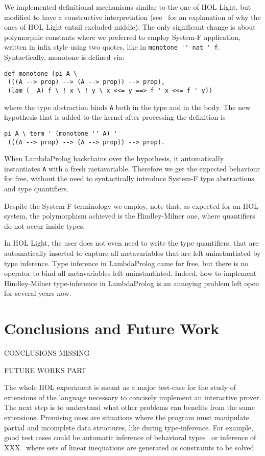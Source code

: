 \documentclass[preprint]{sigplanconf}
\begin{document}
We implemented definitional mechanisms similar to the one of HOL Light, but modified to have a constructive interpretation (see~\cite{arthan} for an explanation of why the ones of HOL Light entail excluded middle). The only significant change is about polymorphic constants where we preferred to employ System-F application, written in infix style using two quotes, like in \verb+monotone '' nat ' f+. Syntactically, monotone is defined via:

{\small
\begin{verbatim}
def monotone (pi A \
 (((A --> prop) --> (A --> prop)) --> prop),
 (lam (_ A) f \ ! x \ ! y \ x <<= y ==> f ' x <<= f ' y))
\end{verbatim}
}

where the type abstraction binds \verb+A+ both in the type and in the body.
The new hypothesis that is added to the kernel after processing the definition
is
{\small \begin{verbatim}
pi A \ term ' (monotone '' A) '
 (((A --> prop) --> (A --> prop)) --> prop).
\end{verbatim}}
When LambdaProlog backchains over the hypothesis, it automatically instantiates \verb+A+ with a fresh metavariable. Therefore we get the expected behaviour for free, without the need to syntactically introduce System-F type abstractions and type quantifiers.

Despite the System-F terminology we employ, note that, as expected for an HOL system, the polymorphism achieved is the Hindley-Milner one, where quantifiers do not occur inside types.

In HOL Light, the user does not even need to write the type quantifiers, that
are automatically inserted to capture all metavariables that are left uninstantiated by type inference. Type inference in LambdaProlog came for free, but there is no operator to bind all metavariables left uninstantiated. Indeed, how to implement Hindley-Milner type-inference in LambdaProlog is an annoying problem left open for several years now.

\section{Conclusions and Future Work}

CONCLUSIONS MISSING

FUTURE WORKS PART

The whole HOL experiment is meant as a major test-case for the study of extensions of the language necessary to concisely implement an interactive prover. The next step is to understand what other problems can benefits from the same extensions. Promising ones are situations where the program must manipulate partial and incomplete data structures, like during type-inference. For example, good test cases could be automatic inference of behavioral types~\cite{cosimo1} or inference of XXX~\cite{baillot1} where sets of linear inequations are generated as constraints to be solved.
\end{document}

